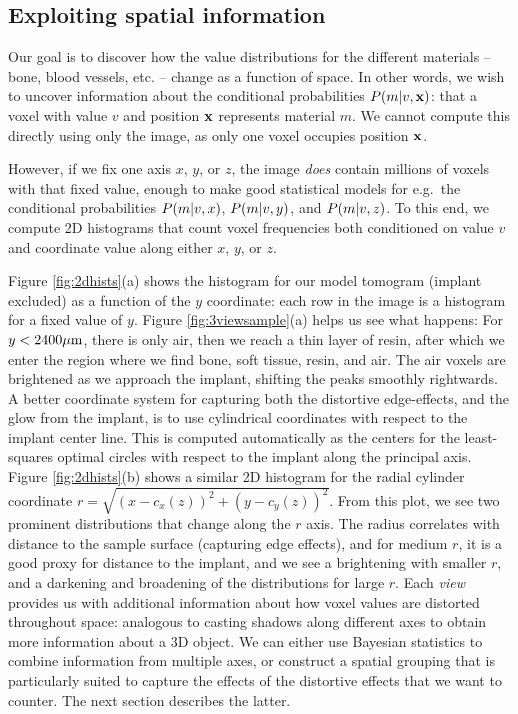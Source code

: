 \subsection{Exploiting spatial information}
Our goal is to discover how the value distributions for the different materials -- bone, blood vessels, etc. --
change as a function of space. In other words, we wish to uncover information about the conditional probabilities $P\!\left(m\middle\vert v,\mathbf{x}\right)$: that a voxel with value $v$ and
position $\mathbf{x}$ represents material $m$. We cannot compute this directly using only the image, as only one voxel occupies position $\mathbf{x}$. 

However, if we fix one axis $x$, $y$, or $z$, the image {\em does} contain millions of voxels with that fixed value, enough to make good statistical
models for e.g.~the conditional probabilities $P\!\left(m\middle\vert v,x\right)$, $P\!\left(m\middle\vert v,y\right)$, and $P\!\left(m\middle\vert v,z\right)$. To this end, we compute 2D histograms that count voxel frequencies
both conditioned on value $v$ and coordinate value along either $x$, $y$, or $z$. 

Figure \ref{fig:2dhists}(a)
shows the histogram for our model tomogram (implant excluded) as a function of the $y$ coordinate: each row in the image is a histogram for a fixed value of $y$.
Figure \ref{fig:3viewsample}(a) helps us see what happens: For $y<2400\mu\text{m}$, there is only air, then we reach a thin layer of resin, after which we enter
the region where we find bone, soft tissue, resin, and air. The air voxels are brightened as we approach the implant, shifting the peaks smoothly rightwards.
A better coordinate system for capturing both the distortive edge-effects, and the glow from the implant, is to use cylindrical coordinates with respect
to the implant center line. This is computed automatically as the centers for the least-squares optimal circles with respect to the implant along the principal axis. 
Figure \ref{fig:2dhists}(b) shows a similar 2D histogram for the radial cylinder coordinate $r=\sqrt{\left( x-c_x(z)\right)^2+\left( y-c_y(z)\right)^2}$.
From this plot, we see two prominent distributions that change along the $r$ axis. The radius correlates with distance to the sample surface
(capturing edge effects), and for medium $r$, it is a good proxy for distance to the implant, and we see a brightening with smaller $r$, and a darkening and
broadening of the distributions for large $r$. Each {\em view} provides us with additional information about how voxel values are distorted throughout space:
analogous to casting shadows along different axes to obtain more information about a 3D object. We can either use Bayesian statistics to combine information
from multiple axes, or construct a spatial grouping that is particularly suited to capture the effects of the distortive effects that we want to counter.
The next section describes the latter.


